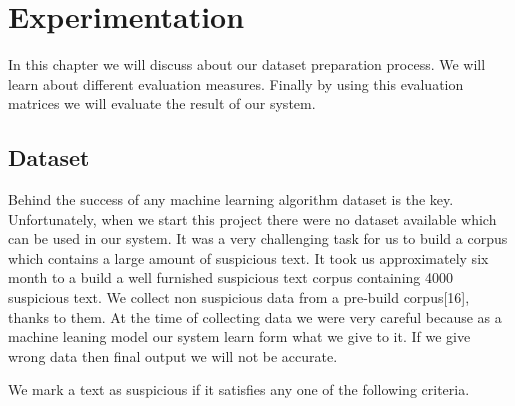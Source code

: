 \documentclass[12pt,a4paper]{report}
\begin{document}






\tableofcontents
\listoffigures
\listoftables
\clearpage
{}

\onehalfspacing  %
%

%
    
%

%

\chapter{Experimentation}
\thispagestyle{empty}
In this chapter we will discuss about our dataset preparation process. We will learn about different evaluation measures. Finally by using this evaluation matrices we will evaluate the result of our system.

\section{Dataset}
Behind the success of any machine learning algorithm dataset is the key. Unfortunately, when we start this project there were no dataset available which can be used in our system. It was a very challenging task for us to build a corpus which contains a large amount of suspicious text. It took us approximately  six month to a build a well furnished  suspicious text corpus containing 4000 suspicious text. We collect non suspicious data from a pre-build corpus[16], thanks to them. At the time of collecting data we were very careful because as a machine leaning model our system learn form what we give to it. If we give wrong data then final output we will not be accurate. \par \vspace{0.5cm}\noindent 
We mark a text as suspicious if it satisfies any one of the following criteria.
\end{document}
